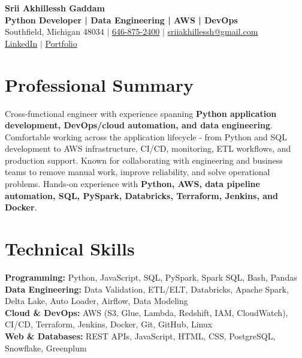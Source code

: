\documentclass[letterpaper,10pt]{article}
\begin{document}
\fontsize{9.35pt}{10.45pt}\selectfont

\begin{center}
    {\LARGE \textbf{Srii Akhillessh Gaddam}} \\[-1pt]
    \textbf{Python Developer | Data Engineering | AWS | DevOps} \\[2pt]
    Southfield, Michigan 48034 $|$
    \href{tel:6468752400}{646-875-2400} $|$
    \href{mailto:sriiakhillessh@gmail.com}{sriiakhillessh@gmail.com} \\[1pt]
    \href{https://www.linkedin.com/in/srii-akhiilessh-gaddam-b48668191/}{LinkedIn} $|$
    \href{https://sriiakhillesshg.github.io/portfolio/}{Portfolio}
\end{center}
\vspace{-8pt}

\section{Professional Summary}
\small{Cross-functional engineer with experience spanning \textbf{Python application development, DevOps/cloud automation, and data engineering}. Comfortable working across the application lifecycle - from Python and SQL development to AWS infrastructure, CI/CD, monitoring, ETL workflows, and production support. Known for collaborating with engineering and business teams to remove manual work, improve reliability, and solve operational problems. Hands-on experience with \textbf{Python, AWS, data pipeline automation, SQL, PySpark, Databricks, Terraform, Jenkins, and Docker}.}

\section{Technical Skills}
\small{
\textbf{Programming:} Python, JavaScript, SQL, PySpark, Spark SQL, Bash, Pandas \\
\textbf{Data Engineering:} Data Validation, ETL/ELT, Databricks, Apache Spark, Delta Lake, Auto Loader, Airflow, Data Modeling \\
\textbf{Cloud \& DevOps:} AWS (S3, Glue, Lambda, Redshift, IAM, CloudWatch), CI/CD, Terraform, Jenkins, Docker, Git, GitHub, Linux \\
\textbf{Web \& Databases:} REST APIs, JavaScript, HTML, CSS, PostgreSQL, Snowflake, Greenplum
}
\end{document}
